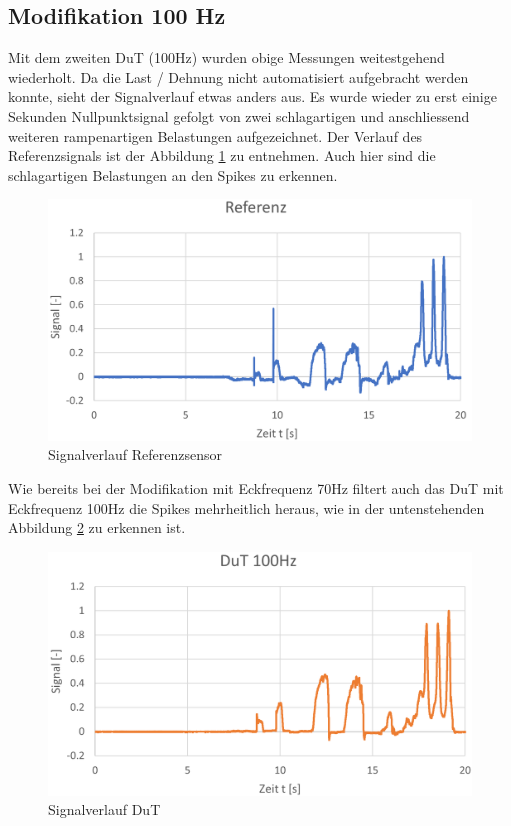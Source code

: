 \documentclass[12pt,a4paper]{article}
\begin{document}
	\subsection{Modifikation 100 Hz}
Mit dem zweiten DuT (100Hz) wurden obige Messungen weitestgehend wiederholt. Da die Last / Dehnung nicht automatisiert aufgebracht werden konnte, sieht der Signalverlauf etwas anders aus. Es wurde wieder zu erst einige Sekunden Nullpunktsignal gefolgt von zwei schlagartigen und anschliessend weiteren rampenartigen Belastungen aufgezeichnet. Der Verlauf des Referenzsignals ist der Abbildung \ref{fig:screenshot002} zu entnehmen. Auch hier sind die schlagartigen Belastungen an den Spikes zu erkennen.
	\begin{figure}[H]
		\centering
		\includegraphics[width=1\linewidth]{Ref_solo_100Hz}
			\caption{Signalverlauf Referenzsensor}
		\label{fig:screenshot002}
	\end{figure}
\noindent Wie bereits bei der Modifikation mit Eckfrequenz 70Hz filtert auch das DuT mit Eckfrequenz 100Hz die Spikes mehrheitlich heraus, wie in der untenstehenden Abbildung \ref{fig:dutOnly100} zu erkennen ist.
	\begin{figure}[H]
		\centering
		\includegraphics[width=1\linewidth]{Dut_solo_100Hz}
		\caption{Signalverlauf DuT}
		\label{fig:dutOnly100}
	\end{figure}
\end{document}
